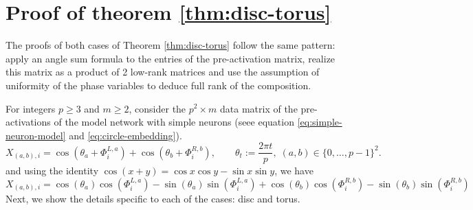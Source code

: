 \documentclass{article} %
\theoremstyle{plain}
\theoremstyle{definition}
\newtheorem{empirical fact}[theorem]{Empirical Fact}
\begin{document}
\section{Proof of theorem \ref{thm:disc-torus}}\label{section: proofs}
The proofs of both cases of Theorem \ref{thm:disc-torus} follow the same pattern: apply an angle sum formula to the entries of the pre-activation matrix, realize this matrix as a product of 2 low-rank matrices and use the assumption of uniformity of the phase variables to deduce full rank of the composition.

For integers $p\ge 3$ and $m\ge 2$, consider the $p^{2}\times m$ data matrix of the pre-activations of the model network with simple neurons (seee equation \ref{eq:simple-neuron-model} and \ref{eq:circle-embedding}).  
\[
  X_{(a,b),i} = \cos(\theta_a+\Phi^{L, a}_i)+\cos(\theta_b+\Phi^{R, b}_i),\qquad
  \theta_t:=\frac{2\pi t}{p},\;(a,b)\in\{0,\dots ,p-1\}^{2}.
\]
and using the identity \(\cos(x + y) = \cos x \cos y - \sin x \sin y\), we have
\begin{equation}\label{eq: X factorisation2}
X_{(a,b),i} = \cos(\theta_a)\cos(\Phi^{L, a}_i) - \sin(\theta_a)\sin(\Phi^{L, a}_i) + \cos(\theta_b)\cos(\Phi^{R, b}_i) - \sin(\theta_b)\sin(\Phi^{R, b}_i)
\end{equation}
Next, we show the details specific to each of the cases: disc and torus.
\end{document}
